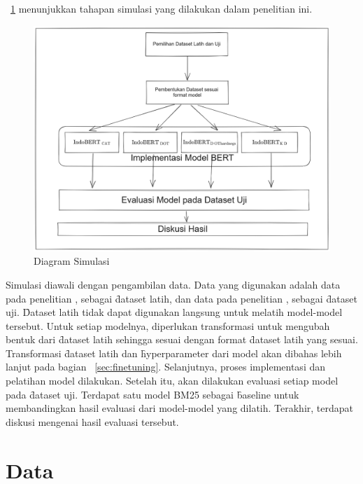 \pic~\ref{fig:diagram-simulasi} menunjukkan tahapan simulasi yang dilakukan dalam penelitian ini.
\begin{figure}
    \centering
    \includegraphics[width=1\textwidth]{assets/pics/alursimulasi.png}
    \caption{Diagram Simulasi}
    \label{fig:diagram-simulasi}

\end{figure}

Simulasi diawali dengan pengambilan data. Data yang digunakan adalah data pada penelitian \cite{mmarco}, sebagai \f{dataset} latih, dan data pada penelitian \cite{mrtydi}, \cite{miracl} sebagai \f{dataset} uji. \f{Dataset} latih tidak dapat digunakan langsung untuk melatih model-model tersebut. Untuk setiap modelnya, diperlukan transformasi untuk mengubah bentuk dari \f{dataset} latih sehingga sesuai dengan format \f{dataset} latih yang sesuai. Transformasi \f{dataset} latih dan \f{hyperparameter} dari model akan dibahas lebih lanjut pada bagian \sect~\ref{sec:finetuning}. Selanjutnya, proses implementasi dan pelatihan model dilakukan. Setelah itu, akan dilakukan evaluasi setiap model pada \f{dataset} uji. Terdapat satu model BM25 sebagai \f{baseline} untuk membandingkan hasil evaluasi dari model-model yang dilatih. Terakhir, terdapat diskusi mengenai hasil evaluasi tersebut.

\section{Data}
\label{sec:dataset}

